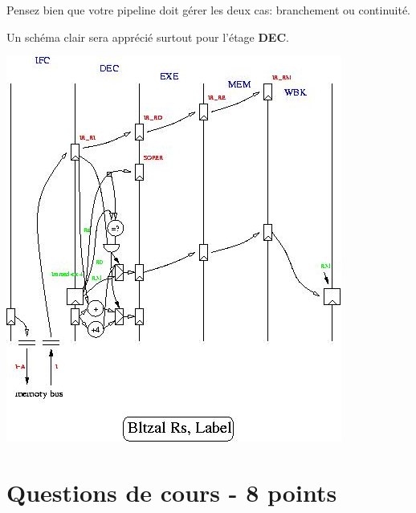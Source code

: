 Pensez bien que votre pipeline doit g\'erer les deux cas: branchement
ou continuit\'e.

Un sch\'ema clair sera appr\'eci\'e surtout pour l'\'etage \textbf{DEC}.

\begin{correction}

  \begin{center}
    \includegraphics[scale=0.7]{figures/correction-vue-detaillee.jpg}
  \end{center}

\end{correction}

%
%

\section{Questions de cours - 8 points}

